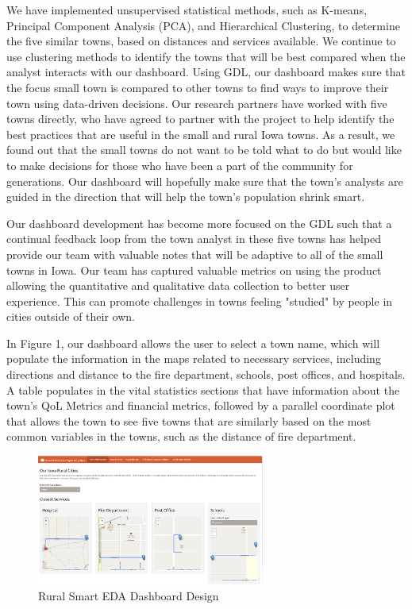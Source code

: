 \documentclass[10pt]{article}\usepackage[]{graphicx}\usepackage[]{color}
\begin{document}
We have implemented unsupervised statistical methods, such as K-means, Principal Component Analysis (PCA), and Hierarchical Clustering, to determine the five similar towns, based on distances and services available. We continue to use clustering methods to identify the towns that will be best compared when the analyst interacts with our dashboard. Using GDL, our dashboard makes sure that the focus small town is compared to other towns to find ways to improve their town using data-driven decisions. Our research partners have worked with five towns directly, who have agreed to partner with the project to help identify the best practices that are useful in the small and rural Iowa towns. As a result, we found out that the small towns do not want to be told what to do but would like to make decisions for those who have been a part of the community for generations. Our dashboard will hopefully make sure that the town's analysts are guided in the direction that will help the town's population shrink smart. 

Our dashboard development has become more focused on the GDL such that a continual feedback loop from the town analyst in these five towns has helped provide our team with valuable notes that will be adaptive to all of the small towns in Iowa. Our team has captured valuable metrics on using the product allowing the quantitative and qualitative data collection to better user experience. This can promote challenges in towns feeling "studied" by people in cities outside of their own. 

In Figure 1, our dashboard allows the user to select a town name, which will populate the information in the maps related to necessary services, including directions and distance to the fire department, schools, post offices, and hospitals. A table populates in the vital statistics sections that have information about the town's QoL Metrics and financial metrics, followed by a parallel coordinate plot that allows the town to see five towns that are similarly based on the most common variables in the towns, such as the distance of fire department. 

\begin{figure}[ht!]
\centering
\includegraphics[width=75mm]{SCC_Dashboard.png}
\caption{Rural Smart EDA Dashboard Design}
\end{figure}
\end{document}

